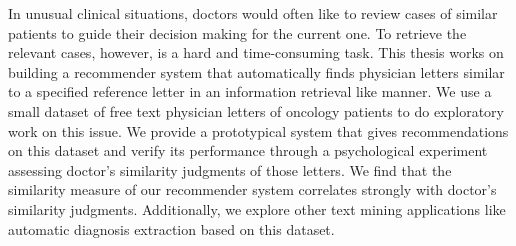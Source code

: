 \documentclass[Thesis.tex]{subfiles}
\begin{document}
\setlength{\parindent}{0cm}
In unusual clinical situations, doctors would often like to review cases of similar patients to guide their decision making for the current one. To retrieve the relevant cases, however, is a hard and time-consuming task. This thesis works on building a recommender system that automatically finds physician letters similar to a specified reference letter in an information retrieval like manner. We use a small dataset of free text physician letters of oncology patients to do exploratory work on this issue. We provide a prototypical system that gives recommendations on this dataset and verify its performance through a psychological experiment assessing doctor's similarity judgments of those letters. We find that the similarity measure of our recommender system correlates strongly with doctor's similarity judgments. Additionally, we explore other text mining applications like automatic diagnosis extraction based on this dataset.
\end{document}
